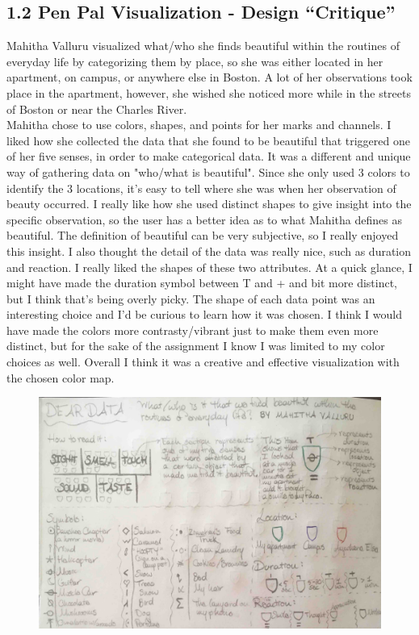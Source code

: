 \documentclass{neu_handout}
\begin{document}
\subsection*{1.2 Pen Pal Visualization - Design “Critique”}

Mahitha Valluru visualized what/who she finds beautiful within the routines of everyday life by categorizing them by place, so she was either located in her apartment, on campus, or anywhere else in Boston. A lot of her observations took place in the apartment, however, she wished she noticed more while in the streets of Boston or near the Charles River.\\

Mahitha chose to use colors, shapes, and points for her marks and channels. I liked how she collected the data that she found to be beautiful that triggered one of her five senses, in order to make categorical data. It was a different and unique way of gathering data on "who/what is beautiful". Since she only used 3 colors to identify the 3 locations, it's easy to tell where she was when her observation of beauty occurred. I really like how she used distinct shapes to give insight into the specific observation, so the user has a better idea as to what Mahitha defines as beautiful. The definition of beautiful can be very subjective, so I really enjoyed this insight. I also thought the detail of the data was really nice, such as duration and reaction. I really liked the shapes of these two attributes. At a quick glance, I might have made the duration symbol between T and + and bit more distinct, but I think that's being overly picky. The shape of each data point was an interesting choice and I'd be curious to learn how it was chosen. I think I would have made the colors more contrasty/vibrant just to make them even more distinct, but for the sake of the assignment I know I was limited to my color choices as well. Overall I think it was a creative and effective visualization with the chosen color map.

\begin{figure}[h]
\centering
{
\includegraphics[page=2,width=0.4\linewidth]{penpal}
}
\end{figure}
\end{document}
